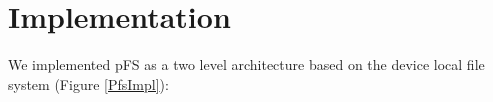 
\section{Implementation}
\label{sec:impl}

%


We implemented pFS as a two level architecture based on the device
local file system (Figure \ref{PfsImpl}):

